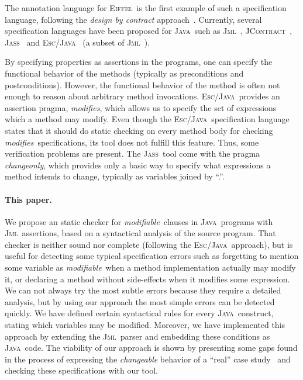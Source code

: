\documentclass[a4paper]{llncs}
\newcommand{\jml}{\textsc{Jml}}
\newcommand{\escj}{\textsc{Esc/Java}}
\newcommand{\jass}{\textsc{Jass}}
\newcommand{\jcontract}{\textsc{JContract}}
\newcommand{\java}{\textsc{Java}}
\newcommand{\eiff}{\textsc{Eiffel}}
\newcommand{\modif}{\textit{modifiable}}
\newcommand{\modifies}{\textit{modifies}}
\begin{document}
The annotation language for \eiff~is the first example of such a
specification language, following the \emph{design by contract}
approach~\cite{Mey97}. Currently, several specification languages have
been proposed for \java~such as \jml~\cite{LBR00},
\jcontract~\cite{JContractUrl}, \jass~\cite{JassUrl} and
\escj~\cite{LeinoNS00} (a subset of \jml~\cite{EscJmlDiff}). 

By specifying properties as assertions in the programs, one can
specify the functional behavior of the methods (typically as
preconditions and postconditions). However, the functional behavior of
the method is
often not enough to reason about arbitrary method
invocations. \escj~provides an assertion pragma, \modifies, which
allows us to
specify the set of expressions which a method may
modify. Even though the \escj~specification language states that it
should
do static checking on every method body for checking
\modifies~specifications, its tool does not fulfill
this feature. Thus, some verification problems are
present. The \jass~tool come with the pragma \textit{changeonly},
which provides only a basic way to specify what expressions a method
intends to change, typically as variables joined by ``.''.






\paragraph{\bf This paper.}We propose an static checker for
\modif~clauses in \java~programs with \jml~assertions, based on a
syntactical analysis of the source program. That
checker is neither sound nor complete (following the \escj~approach),
but is useful
for detecting some typical specification errors such as
forgetting to mention some variable
as \modif~when a method implementation actually may modify it, or
declaring a method without side-effects when it modifies some
expression. We can not always try the most subtle errors because they 
require a detailed analysis, but by using our approach the most
simple errors can be detected quickly. We have defined certain
syntactical rules for every \java~construct, stating which
variables may be modified. Moreover, we have implemented
this approach by extending the \jml~parser and embedding these
conditions as \java~code. The viability of our approach is
shown by presenting some gaps found in the process of expressing the
\emph{changeable} behavior of a ``real'' case study~\cite{CH02} and
checking
these specifications with our tool.
\end{document}
